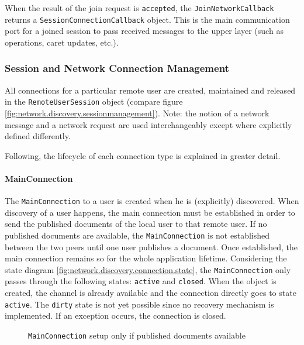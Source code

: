 When the result of the join request is  \texttt{accepted}, the \texttt{JoinNetworkCallback} returns a \texttt{Session\-Connection\-Callback} object. This is the main communication port for a joined session to pass received messages to the upper layer (such as operations, caret updates, etc.).


\subsubsection{Session and Network Connection Management}
All connections for a particular remote user are created, maintained and released in the \texttt{RemoteUserSession} object (compare figure \ref{fig:network.discovery.sessionmanagement}). Note: the notion of a network message and a network request are used interchangeably except where explicitly defined differently.

Following, the lifecycle of each connection type is explained in greater detail.

\paragraph{MainConnection}
The \texttt{MainConnection} to a user is created when he is (explicitly) discovered. When discovery of a user happens, the main connection must be established in order to send the published documents of the local user to that remote user. If no published documents are available, the \texttt{MainConnection} is not established between the two peers until one user publishes a document. Once established, the main connection remains so for the whole application lifetime. Considering the state diagram \ref{fig:network.discovery.connection.state}, the \texttt{MainConnection} only passes through the following states: \texttt{active} and \texttt{closed}. When the object is created, the channel is already available and the connection directly goes to state  \texttt{active}. The \texttt{dirty} state is not yet possible since no recovery mechanism is implemented. If an exception occurs, the connection is closed.

\begin{figure}[H]
 \centering
 \caption{\texttt{MainConnection} setup only if published documents available}
 \label{fig:network.protocol.mainconnectionsetup}
\end{figure}

